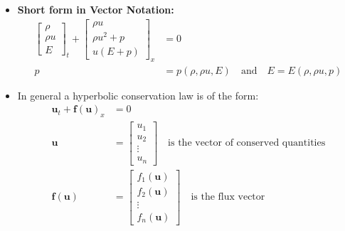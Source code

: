 \begin{itemize}
\[        \]
  \item \textbf{Short form in Vector Notation:}
        \begin{align*}
          \begin{bmatrix}
            \rho   \\
            \rho u \\
            E
          \end{bmatrix}_t + \begin{bmatrix}
                              \rho u       \\
                              \rho u^2 + p \\
                              u(E + p)
                            \end{bmatrix}_x & = 0                                                                \\
          p                                 & = p(\rho, \rho u, E) \quad \text{and} \quad E = E(\rho, \rho u, p)
        \end{align*}
  \item In general a hyperbolic conservation law is of the form:
        \begin{align*}
          \symbf{u}_t + \symbf{f}(\symbf{u})_x & = 0                                                                \\
          \symbf{u}                            & = \begin{bmatrix}
                                                     u_1    \\
                                                     u_2    \\
                                                     \vdots \\
                                                     u_n
                                                   \end{bmatrix} \quad \text{is the vector of conserved quantities} \\
          \symbf{f}(\symbf{u})                 & = \begin{bmatrix}
                                                     f_1(\symbf{u}) \\
                                                     f_2(\symbf{u}) \\
                                                     \vdots         \\
                                                     f_n(\symbf{u})
                                                   \end{bmatrix} \quad \text{is the flux vector}

\end{align*}
\end{itemize}

